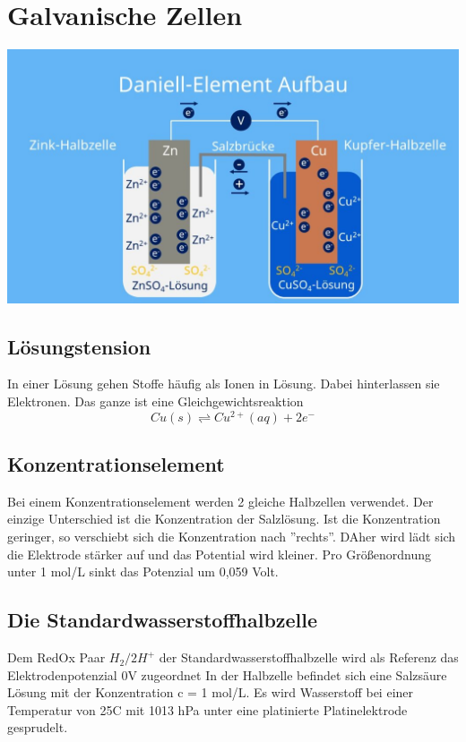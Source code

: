 \documentclass{article}
\begin{document}
\section*{Galvanische Zellen}
\includegraphics*[width=\textwidth]{img/galvanische_zelle.jpg}

\subsection*{Lösungstension}
In einer Lösung gehen Stoffe häufig als Ionen in Lösung. Dabei hinterlassen sie Elektronen. Das ganze ist
eine Gleichgewichtsreaktion
    \begin{equation}
        Cu(s) \rightleftharpoons Cu^{2+}(aq) + 2 e^-
    \end{equation}
\subsection*{Konzentrationselement}
Bei einem Konzentrationselement werden 2 gleiche Halbzellen verwendet. Der einzige Unterschied 
ist die Konzentration der Salzlösung. Ist die Konzentration geringer, so verschiebt sich die Konzentration
nach ''rechts''. DAher wird lädt sich die Elektrode stärker auf und das Potential wird kleiner.
Pro Größenordnung unter 1 mol/L sinkt das Potenzial um 0,059 Volt.

\subsection*{Die Standardwasserstoffhalbzelle}
Dem RedOx Paar $H_2/2H^+$ der Standardwasserstoffhalbzelle wird als Referenz das Elektrodenpotenzial 0V zugeordnet
In der Halbzelle befindet sich eine Salzsäure Lösung mit der Konzentration c = 1 mol/L. Es wird Wasserstoff
bei einer Temperatur von 25\textdegree C mit 1013 hPa unter eine platinierte Platinelektrode gesprudelt.
\end{document}
